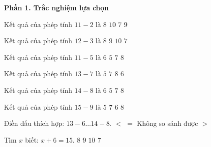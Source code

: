 \textbf{Phần 1. Trắc nghiệm lựa chọn}

\begin{ex} %
Kết quả của phép tính $11 - 2$ là
\choice
{$8$}
{$10$}
{$7$}
{\True $9$}
\end{ex}

\begin{ex} %
Kết quả của phép tính $12 - 3$ là
\choice
{$8$}
{\True $9$}
{$10$}
{$7$}
\end{ex}

\begin{ex} %
Kết quả của phép tính $11 - 5$ là
\choice
{\True $6$}
{$5$}
{$7$}
{$8$}
\end{ex}

\begin{ex} %
Kết quả của phép tính $13 - 7$ là
\choice
{$5$}
{$7$}
{$8$}
{\True $6$}
\end{ex}

\begin{ex} %
Kết quả của phép tính $14 - 8$ là
\choice
{\True $6$}
{$5$}
{$7$}
{$8$}
\end{ex}

\begin{ex} %
Kết quả của phép tính $15 - 9$ là
\choice
{$5$}
{$7$}
{\True $6$}
{$8$}
\end{ex}

\begin{ex} %
Điền dấu thích hợp: $13 - 6 \dots 14 - 8$.
\choice
{$<$}
{$=$}
{Không so sánh được}
{\True $>$}
\end{ex}

\begin{ex} %
Tìm $x$ biết: $x + 6 = 15$.
\choice
{$8$}
{\True $9$}
{$10$}
{$7$}
\end{ex}

